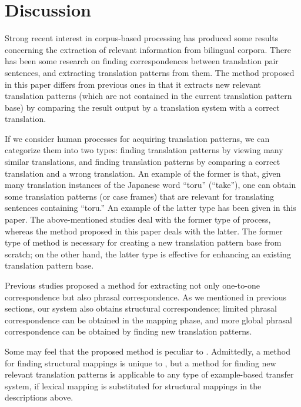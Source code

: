 \section{Discussion}
\label{sec:discuss}

Strong recent interest in corpus-based processing has produced some results
concerning the extraction of relevant information from bilingual corpora. 
There has been some research
\cite{kaji92,utsuro92,utsuro93,matsumoto93,ishimoto93} on finding
correspondences between translation pair sentences, and extracting translation
patterns from them.  The method proposed in this paper differs from previous
ones in that it extracts new relevant translation patterns (which are not
contained in the current translation pattern base) by comparing the result
output by a translation system with a correct translation.

If we consider human processes for acquiring translation patterns, we can
categorize them into two types: finding translation patterns by viewing many
similar translations, and finding translation patterns by comparing a correct
translation and a wrong translation.  An example of the former is that, given
many translation instances of the Japanese word ``toru'' (``take''), one can
obtain some translation patterns (or case frames) that are relevant for
translating sentences containing ``toru.'' An example of the latter type has
been given in this paper. The above-mentioned studies
\cite{kaji92,utsuro92} deal with the former type of process, whereas the
method proposed in this paper deals with the latter.  The former type of
method is necessary for creating a new translation pattern base from
scratch; on the other hand, the latter type is effective for
enhancing an existing translation pattern base.

Previous studies \cite{matsumoto93,ishimoto93} proposed a method for
extracting not only one-to-one correspondence but also phrasal correspondence.
As we mentioned in previous sections, our system also obtains structural
correspondence; limited phrasal correspondence can be obtained in the mapping
phase, and more global phrasal correspondence can be obtained by finding new
translation patterns.

Some may feel that the proposed method is peculiar to \SimTran. Admittedly, a
method for finding structural mappings is unique to \SimTran, but a method for
finding new relevant translation patterns is applicable to any type of
example-based transfer system, if lexical mapping is substituted for
structural mappings in the descriptions above.

